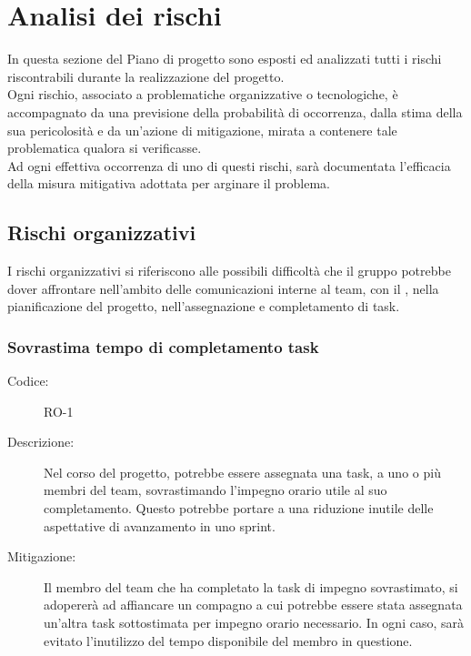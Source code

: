 \chapter{Analisi dei rischi}\label{chap:rischi}

In questa sezione del Piano di progetto sono esposti ed analizzati tutti i rischi riscontrabili durante la realizzazione del progetto.\\Ogni rischio, associato a problematiche organizzative o tecnologiche, è accompagnato da una previsione della probabilità di occorrenza, dalla stima della sua pericolosità e da un'azione di mitigazione, mirata a contenere tale problematica qualora si verificasse.\\Ad ogni effettiva occorrenza di uno di questi rischi, sarà documentata l'efficacia della misura mitigativa adottata per arginare il problema.

\section{Rischi organizzativi}
I rischi organizzativi si riferiscono alle possibili difficoltà che il gruppo potrebbe dover affrontare nell'ambito delle comunicazioni interne al team, con il , nella pianificazione del progetto, nell'assegnazione e completamento di task.

\subsection*{Sovrastima tempo di completamento task}
\begin{description}
    \item[Codice:] RO-1
    \item[Descrizione:] Nel corso del progetto, potrebbe essere assegnata una task, a uno o più membri del team, sovrastimando l'impegno orario utile al suo completamento. Questo potrebbe portare a una riduzione inutile delle aspettative di avanzamento in uno sprint.
    \item[Mitigazione:] Il membro del team che ha completato la task di impegno sovrastimato, si adopererà ad affiancare un compagno a cui potrebbe essere stata assegnata un'altra task sottostimata per impegno orario necessario. In ogni caso, sarà evitato l'inutilizzo del tempo disponibile del membro in questione.
\end{description}

